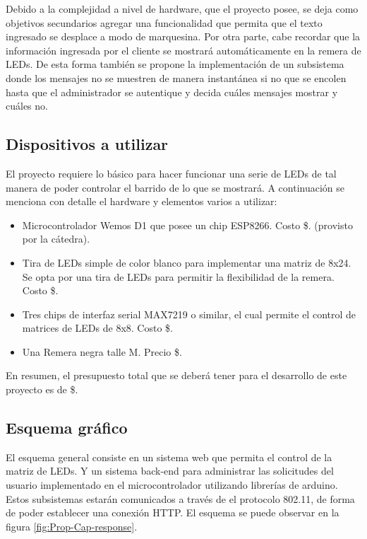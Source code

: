 Debido a la complejidad a nivel de hardware, que el proyecto posee, se deja como objetivos secundarios agregar una funcionalidad que permita que el texto ingresado se desplace a modo de marquesina. Por otra parte, cabe recordar que la información ingresada por el cliente se mostrará automáticamente en la remera de LEDs. De esta forma también se propone la implementación de un subsistema donde los mensajes no se muestren de manera instantánea si no que se encolen hasta que el administrador se autentique y decida cuáles mensajes mostrar y cuáles no.
\subsection{Dispositivos a utilizar}
El proyecto requiere lo básico para hacer funcionar una serie de LEDs de tal manera de poder controlar el barrido de lo que se mostrará. A continuación se menciona con detalle el hardware y elementos varios a utilizar:


\begin{itemize}
    \item Microcontrolador Wemos D1 que posee un chip ESP8266. Costo \$\costoMicro. (provisto por la cátedra).
    \item Tira de LEDs simple de color blanco para implementar una matriz de 8x24. Se opta por una tira de LEDs para permitir la flexibilidad de la remera. Costo  \$\costoLEDs.
    \item Tres chips de interfaz serial MAX7219 o similar, el cual permite el control de matrices de LEDs de 8x8. Costo \$\costoShifter.
    \item Una Remera negra talle M. Precio \$\costoRemera.
\end{itemize}


En resumen, el presupuesto total que se deberá tener para el desarrollo de este proyecto es de \$\costoTotal.

\subsection{Esquema gráfico}
El esquema general consiste en un sistema web que permita el control de la matriz de LEDs. Y un sistema back-end para administrar las solicitudes del usuario implementado en el microcontrolador utilizando librerías de arduino. Estos subsistemas estarán comunicados a través de el protocolo 802.11, de forma de poder establecer una conexión HTTP. El esquema se puede observar en la figura \ref{fig:Prop-Cap-response}.

